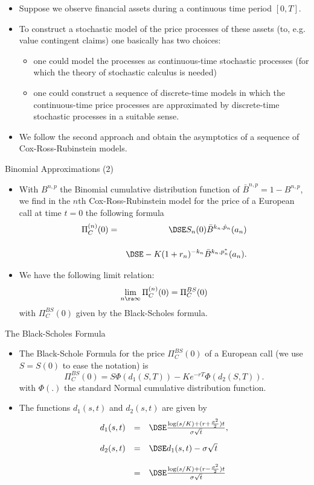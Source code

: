\begin{itemize}
  \item Suppose we observe financial assets during a continuous time
period $[0,T]$.
\item To construct a stochastic model of the price
processes of these assets (to, e.g. value contingent claims) one
basically has two choices:
\begin{itemize}
  \item one could model the processes as
continuous-time stochastic processes (for which the theory of
stochastic calculus is needed)
\item  one could construct a sequence of discrete-time models in which
the continuous-time price processes are approximated by
discrete-time stochastic processes in a suitable sense.
\end{itemize}
\item  We follow the second approach and obtain the asymptotics
 of a sequence of Cox-Ross-Rubinstein models.
\end{itemize}




{Binomial Approximations (2)}

\begin{itemize}
 \item
 With $B^{n, p}$ the Binomial cumulative distribution function of
 $\bar{B}^{n, p} = 1- B^{n, p}$, we find in the $n$th
Cox-Ross-Rubinstein model for the price of a European call at time
$t=0$ the following formula
\begin{eqnarray}\label{crrpricen}
\Pi_C^{(n)}(0) &=&\DSE S_n(0) \bar{B}^{k_n, \hat{p}_n}(a_n)\\*[12pt]\nonumber
&&\DSE- K
(1+r_n)^{-k_n} \bar{B}^{k_n, p^*_n}(a_n).
\end{eqnarray}
 \item We have the following limit relation:
$$
\lim_{n \ra \infty} \Pi_C^{(n)}(0) = \Pi_C^{BS}(0)
$$
with $\Pi_C^{BS}(0)$ given by the Black-Scholes formula.
\end{itemize}




{The Black-Scholes Formula}

\begin{itemize}
\item The Black-Schole Formula for the price $\Pi_C^{BS}(0)$ of a European call  (we use
$S=S(0)$ to ease the notation) is
\begin{equation}\label{BScallprice4}
\Pi_C^{BS}(0) = S \Phi(d_1(S, T)) - K e^{-rT} \Phi(d_2(S, T)).
\end{equation}
with $\Phi(.)$ the standard Normal cumulative distribution function.
\item The functions $d_1(s,t)$ and $d_2(s,t)$ are given by
$$
\begin{array}{lll}
d_1(s,t) &=&\DSE \frac{\log(s/K) + (r +
\frac{\sigma^2}{2})t}{\sigma \sqrt{t}},\\*[12pt] d_2(s,t) &=&\DSE
d_1(s,t) -\sigma \sqrt{t}\\*[12pt]
&=&\DSE \frac{\log(s/K) + (r -
\frac{\sigma^2}{2})t}{\sigma \sqrt{t}}
\end{array}
$$
\end{itemize}


